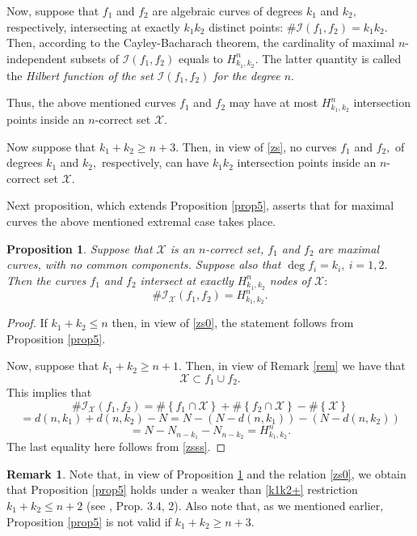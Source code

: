\documentclass[a4paper,12pt]{article}
\newtheorem{proposition}[lemma]{Proposition}
\theoremstyle{definition}
\newtheorem{remark}[lemma]{Remark}
\numberwithin{equation}{section}
\numberwithin{figure}{section}
\newcommand{\Iset}{\mathcal{I}}
\newcommand{\Xset}{\mathcal{X}}
\begin{document}
Now, suppose that $f_1$ and $f_2$ are algebraic curves of degrees $k_1$ and $k_2,$ respectively, intersecting at exactly $k_1k_2$ distinct points:
$\#\Iset(f_1,f_2)=k_1k_2.$ 
Then, according to the Cayley-Bacharach theorem, the cardinality of maximal $n$-independent subsets of $\Iset(f_1,f_2)$ equals to $H_{k_1,k_2}^n.$   The latter quantity is called the \emph{Hilbert function of the set $\Iset(f_1,f_2)$ for the degree $n.$} 



Thus, the above mentioned curves $f_1$ and $f_2$ may have at most
$H_{k_1,k_2}^n$ intersection points inside an $n$-correct set $\Xset.$

Now suppose that $ k_1 + k_2\ge n+3.$ Then, in view of  \eqref{zs}, no curves $f_1$ and $f_2,$ of degrees $k_1$ and $k_2,$ respectively, can have $k_1k_2$ intersection points inside an $n$-correct set $\Xset.$

Next proposition, which extends Proposition \ref{prop5}, asserts that for  maximal curves the above mentioned extremal case takes place.

\begin{proposition}\label{prop6}
Suppose that $\Xset$ is an $n$-correct set, $f_1$ and $f_2$ are
maximal curves, with no common components. Suppose also that  $\deg f_i=k_i,\ i=1,2.$ Then the curves $f_1$ and $f_2$ intersect at exactly $H_{k_1,k_2}^n$ nodes of $\Xset:$
$$\#\Iset_\Xset(f_1,f_2) =H_{k_1,k_2}^n.$$
\end{proposition}
\begin{proof} If $k_1+k_2\le n$ then, in view of \eqref{zs0}, the statement follows from Proposition \ref{prop5}.
  
Now, suppose that $k_1+k_2 \ge n+1$. Then, in view of Remark \ref{rem} we have that 
\begin{equation*} 
	\Xset \subset f_1 \cup f_2.
\end{equation*}
This implies that
\begin{equation*}\#\Iset_\Xset(f_1,f_2) = \#\left\{f_1\cap \Xset\right\}+\#\left\{f_2\cap \Xset\right\}-\#\left\{\Xset\right\} \end{equation*}
$$= d(n,k_1)+d(n,k_2)- N= N-\left(N-d(n,k_1)\right)-(N-d(n,k_2))$$
$$=N-N_{n-k_1}- N_{n-k_2}=H_{k_1,k_2}^n.$$
The last equality here follows from \eqref{zsss}.
\end{proof}


\begin{remark} \label{rem1} Note that, in view of Proposition \ref{prop6} and the relation \eqref{zs0}, we obtain that Proposition \ref{prop5} holds under a weaker than \eqref{k1k2+} restriction 
$k_1+k_2\le n+2$ (see \cite{Raf}, Prop. 3.4, 2).  Also note that, as we mentioned earlier, Proposition \ref{prop5} is not valid if $k_1+k_2\ge n+3.$\end{remark} 
\end{document}
